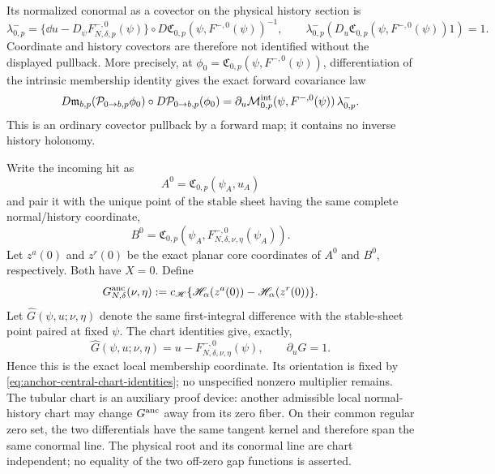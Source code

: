 Its normalized conormal as a covector on the physical history section is
\begin{equation}
 \lambda^-_{0,p}
 =\{\dd u-D_\psi F^{-,0}_{N,\delta,p}(\psi)\}
      \circ D\mathfrak C_{0,p}(\psi,F^{-,0}(\psi))^{-1},
 \qquad
 \lambda^-_{0,p}
   (D_u\mathfrak C_{0,p}(\psi,F^{-,0}(\psi))1)=1.     \label{eq:anchor-central-physical-conormal}
\end{equation}
Coordinate and history covectors are therefore not identified without the
displayed pullback.  More precisely, at
\(\phi_0=\mathfrak C_{0,p}(\psi,F^{-,0}(\psi))\), differentiation of the
intrinsic membership identity gives the exact forward covariance law
\begin{equation}
 D\mathfrak m_{b,p}(\mathcal P_{0\to b,p}\phi_0)
   \circ D\mathcal P_{0\to b,p}(\phi_0)
 =\partial_u\mathcal M_{0,p}^{\rm int}
     (\psi,F^{-,0}(\psi))\,\lambda^-_{0,p}.           \label{eq:anchor-central-conormal-forward-pullback}
\end{equation}
This is an ordinary covector pullback by a forward map; it contains no
inverse history holonomy.

Write the incoming hit as
\[
 A^0=\mathfrak C_{0,p}(\psi_A,u_A)
\]
and pair it with the unique point of the stable sheet having the same
complete normal/history coordinate,
\begin{equation}
 B^0=\mathfrak C_{0,p}
   (\psi_A,F^{-,0}_{N,\delta,\nu,\eta}(\psi_A)).     \label{eq:anchor-paired-stable-point}
\end{equation}
Let \(z^a(0)\) and \(z^r(0)\) be the exact planar core coordinates of
\(A^0\) and \(B^0\), respectively.  Both have \(X=0\).  Define
\begin{equation}
 G^{\rm anc}_{N,\delta}(\nu,\eta)
 :=c_{\mathscr H}\{\mathscr H_\alpha(z^a(0))
               -\mathscr H_\alpha(z^r(0))\}.       \label{eq:anchor-physical-gap}
\end{equation}
Let \(\widehat G(\psi,u;\nu,\eta)\) denote the same first-integral
difference with the stable-sheet point paired at fixed \(\psi\).  The chart
identities give, exactly,
\begin{equation}
 \widehat G(\psi,u;\nu,\eta)
 =u-F^{-,0}_{N,\delta,\nu,\eta}(\psi),\qquad
 \partial_u\widehat G=1 .                           \label{eq:anchor-gap-coordinate-transversality}
\end{equation}
Hence this is the exact local membership coordinate.  Its orientation is
fixed by \cref{eq:anchor-central-chart-identities}; no unspecified nonzero
multiplier remains.
The tubular chart is an auxiliary proof device: another admissible local
normal-history chart may change \(G^{\rm anc}\) away from its zero fiber.
On their common regular zero set, the two differentials have the same tangent
kernel and therefore span the same conormal line.  The physical root and its
conormal line are chart independent; no equality of the two off-zero gap
functions is asserted.

